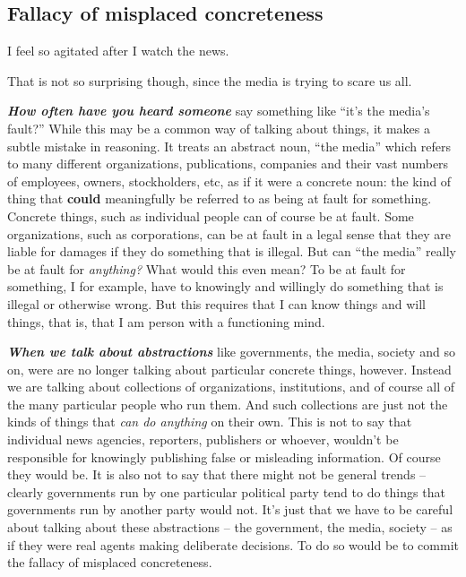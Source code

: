 \documentclass[
  12pt, openany]{book}
\theoremstyle{definition}
\theoremstyle{definition}
\theoremstyle{definition}
\theoremstyle{remark}
\begin{document}
\hypertarget{fallacy-of-misplaced-concreteness}{%
\subsection*{Fallacy of misplaced concreteness}\label{fallacy-of-misplaced-concreteness}}


\begin{center}

\begin{argument}

I feel so agitated after I watch the news.

That is not so surprising though, since the media is trying to scare us all.

\end{argument}

\end{center}

\textbf{\emph{How often have you heard someone}} say something like ``it's the media's fault?'' While this may be a common way of talking about things, it makes a subtle mistake in reasoning. It treats an abstract noun, ``the media'' which refers to many different organizations, publications, companies and their vast numbers of employees, owners, stockholders, etc, as if it were a concrete noun: the kind of thing that \textbf{could} meaningfully be referred to as being at fault for something. Concrete things, such as individual people can of course be at fault. Some organizations, such as corporations, can be at fault in a legal sense that they are liable for damages if they do something that is illegal. But can ``the media'' really be at fault for \emph{anything?} What would this even mean? To be at fault for something, I for example, have to knowingly and willingly do something that is illegal or otherwise wrong. But this requires that I can know things and will things, that is, that I am person with a functioning mind.

\textbf{\emph{When we talk about abstractions}} like governments, the media, society and so on, were are no longer talking about particular concrete things, however. Instead we are talking about collections of organizations, institutions, and of course all of the many particular people who run them. And such collections are just not the kinds of things that \emph{can do anything} on their own. This is not to say that individual news agencies, reporters, publishers or whoever, wouldn't be responsible for knowingly publishing false or misleading information. Of course they would be. It is also not to say that there might not be general trends -- clearly governments run by one particular political party tend to do things that governments run by another party would not. It's just that we have to be careful about talking about these abstractions -- the government, the media, society -- as if they were real agents making deliberate decisions. To do so would be to commit the fallacy of misplaced concreteness.
\end{document}
